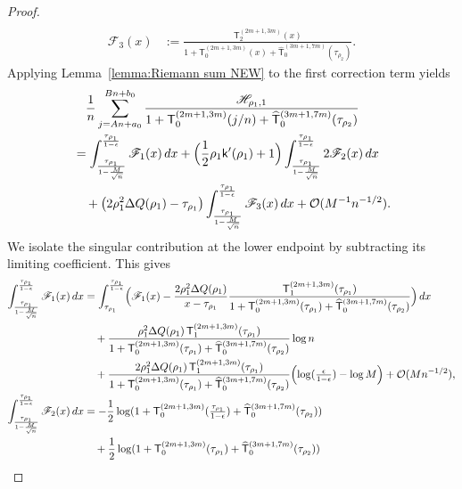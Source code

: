 \documentclass[a4paper]{article}
\numberwithin{equation}{section}
\begin{document}
\begin{proof}
\begin{align*}
\\
\mathscr{F}_3(x)&:=
\frac{\mathsf{T}_{2}^{(2m+1,3m)}(x)}{1+\mathsf{T}_{0}^{(2m+1,3m)}(x)+\widehat{\mathsf{T}}_{0}^{(3m+1,7m)}(\tau_{\rho_2})}. 
\end{align*}
Applying Lemma~\ref{lemma:Riemann sum NEW} to the first correction term yields
\begin{align*}
&\quad \frac{1}{n}\sum_{j=An+a_0}^{Bn+b_0}
\frac{\mathscr{H}_{\rho_1,1}}{1+\mathsf{T}_{0}^{(2m+1,3m)}(j/n)+\widehat{\mathsf{T}}_{0}^{(3m+1,7m)}(\tau_{\rho_2})}
\\
&=
\int_{\frac{\tau_{\rho_1}}{1-\frac{M}{\sqrt{n}}}}^{\frac{\tau_{\rho_1}}{1-\epsilon}}
\mathscr{F}_1(x)\,dx
+
\Bigl(\frac{1}{2}\rho_1\mathsf{k}'(\rho_1)+1\Bigr)
\int_{\frac{\tau_{\rho_1}}{1-\frac{M}{\sqrt{n}}}}^{\frac{\tau_{\rho_1}}{1-\epsilon}}
2\mathscr{F}_2(x)
\,dx
\\
&\quad
+
\bigl(2\rho_1^2\Delta Q(\rho_1)-\tau_{\rho_1}\bigr)
\int_{\frac{\tau_{\rho_1}}{1-\frac{M}{\sqrt{n}}}}^{\frac{\tau_{\rho_1}}{1-\epsilon}}
\mathscr{F}_3(x)
\,dx
+\mathcal{O}(M^{-1}n^{-1/2}). 
\end{align*}
We isolate the singular contribution at the lower endpoint by subtracting
its limiting coefficient.  This gives
\begin{align*}
\int_{\frac{\tau_{\rho_1}}{1-\frac{M}{\sqrt{n}}}}^{\frac{\tau_{\rho_1}}{1-\epsilon}}
\mathscr{F}_1(x)\,dx
&=
\int_{\tau_{\rho_1}}^{\frac{\tau_{\rho_1}}{1-\epsilon}}
\Bigl(\mathscr{F}_1(x)
-\frac{2\rho_1^2\Delta Q(\rho_1)}{x-\tau_{\rho_1}}\frac{\mathsf{T}_{1}^{(2m+1,3m)}(\tau_{\rho_1})}{1+\mathsf{T}_{0}^{(2m+1,3m)}(\tau_{\rho_1})+\widehat{\mathsf{T}}_{0}^{(3m+1,7m)}(\tau_{\rho_2})}\Bigr)\,dx
\\
&\quad 
+
\frac{\rho_1^2\Delta Q(\rho_1)\,\mathsf{T}_{1}^{(2m+1,3m)}(\tau_{\rho_1})}{1+\mathsf{T}_{0}^{(2m+1,3m)}(\tau_{\rho_1})+\widehat{\mathsf{T}}_{0}^{(3m+1,7m)}(\tau_{\rho_2})}
\log n
\\
&\quad
+
\frac{2\rho_1^2\Delta Q(\rho_1)\,\mathsf{T}_{1}^{(2m+1,3m)}(\tau_{\rho_1})}{1+\mathsf{T}_{0}^{(2m+1,3m)}(\tau_{\rho_1})+\widehat{\mathsf{T}}_{0}^{(3m+1,7m)}(\tau_{\rho_2})}
\Bigl( 
\log(\tfrac{\epsilon}{1-\epsilon})-\log M
\Bigr)
+
\mathcal{O}(Mn^{-1/2}), 
\\
\int_{\frac{\tau_{\rho_1}}{1-\frac{M}{\sqrt{n}}}}^{\frac{\tau_{\rho_1}}{1-\epsilon}}
\mathscr{F}_2(x)
\,dx
&
=
-\frac{1}{2}\log(1+\mathsf{T}_0^{(2m+1,3m)}(\tfrac{\tau_{\rho_1}}{1-\epsilon})+\widehat{\mathsf{T}}_{0}^{(3m+1,7m)}(\tau_{\rho_2}))
\\
&\quad
+\frac{1}{2}\log(1+\mathsf{T}_0^{(2m+1,3m)}(\tau_{\rho_1})+\widehat{\mathsf{T}}_{0}^{(3m+1,7m)}(\tau_{\rho_2}))

\end{align*}
\end{proof}
\end{document}
